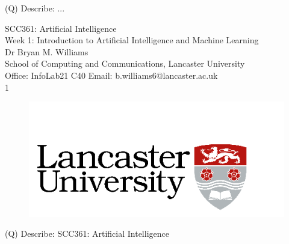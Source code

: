 \documentclass[12pt]{article}
\begin{document}
(Q)
Describe: ...
\clearpage

SCC361: Artificial Intelligence\\
Week 1: Introduction to Artificial Intelligence and Machine Learning\\
Dr Bryan M. Williams\\
School of Computing and Communications, Lancaster University\\
Office: InfoLab21 C40 Email: b.williams6@lancaster.ac.uk\\
1\\
\begin{figure}[H]
\includegraphics[width=0.5\linewidth]{page1-image-1.png}
\end{figure}
\clearpage
(Q)
Describe: SCC361: Artificial Intelligence
\clearpage
\end{document}

